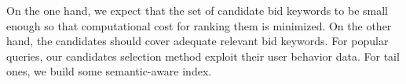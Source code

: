 On the one hand, we expect that the set of candidate bid keywords to be small enough so
that computational cost for ranking them is minimized.  On the other hand,
the candidates should cover adequate relevant bid keywords.  For
popular queries, our candidates selection method exploit their user
behavior data.  For tail ones, we build some semantic-aware index.
%
%
%
